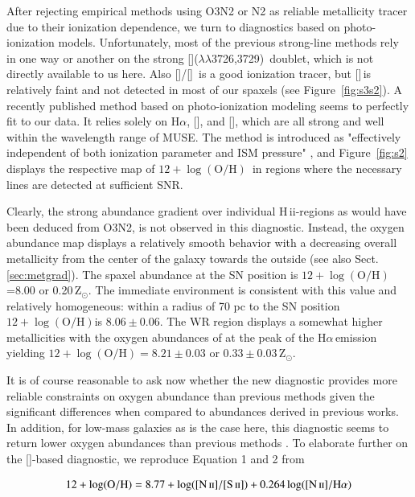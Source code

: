 \documentclass[traditabstract]{aa}
\newcommand{\ha}{H$\alpha$}
\newcommand{\hii}{\mbox{H\,{\sc ii}}}
\newcommand{\oh}{$12+\log(\mathrm{O/H})$}
\newcommand{\sii}{[\ion{S}{ii}]}
\newcommand{\siii}{[\ion{S}{iii}]}
\newcommand{\oii}{[\ion{O}{ii}]}
\newcommand{\nii}{[\ion{N}{ii}]}
\begin{document}
After rejecting empirical methods using O3N2 or N2 as reliable metallicity tracer due to their ionization dependence, we turn to diagnostics based on photo-ionization models. Unfortunately, most of the previous strong-line methods rely in one way or another on the strong \oii($\lambda\lambda$3726,3729)\, doublet\citep{2002ApJS..142...35K}, which is not directly available to us here. Also \siii/\sii\, is a good ionization tracer, but \siii\,is relatively faint and not detected in most of our spaxels (see Figure~\ref{fig:s3s2}). A recently published method based on photo-ionization modeling \citep{2016Ap&SS.361...61D} seems to perfectly fit to our data. It relies solely on \ha, \nii, and \sii, which are all strong and well within the wavelength range of MUSE. The method is introduced as "effectively independent of both ionization parameter and ISM pressure" \citep{2016Ap&SS.361...61D}, and Figure~\ref{fig:s2} displays the respective map of \oh\, in regions where the necessary lines are detected at sufficient SNR.

Clearly, the strong abundance gradient over individual \hii-regions as would have been deduced from O3N2, is not observed in this diagnostic. Instead, the oxygen abundance map displays a relatively smooth behavior with a decreasing overall metallicity from the center of the galaxy towards the outside (see also Sect. \ref{sec:metgrad}). The spaxel abundance at the SN position is \oh=8.00 or 0.20\,Z$_{\odot}$. The immediate environment is consistent with this value and relatively homogeneous: within a radius of 70 pc to the SN position \oh is $8.06\pm 0.06$. The WR region displays a somewhat higher metallicities with the oxygen abundances of at the peak of the \ha\,emission yielding \oh$=8.21\pm 0.03$ or $0.33\pm0.03\,$Z$_{\odot}$.

It is of course reasonable to ask now whether the new \citet{2016Ap&SS.361...61D} diagnostic provides more reliable constraints on oxygen abundance than previous methods given the significant differences when compared to abundances derived in previous works. In addition, for low-mass galaxies as is the case here, this diagnostic seems to return lower oxygen abundances than previous methods \citep{2016ApJ...823L..24K}. To elaborate further on the \sii-based diagnostic, we reproduce Equation 1 and 2 from \citet{2016Ap&SS.361...61D}

\begin{equation}
12+\log(\mathrm{O/H}) = 8.77 + \log([\ion{N}{ii}]/[\ion{S}{ii}]) + 0.264\log([\ion{N}{ii}]/\mathrm{H}\alpha)
\end{equation}
\end{document}
